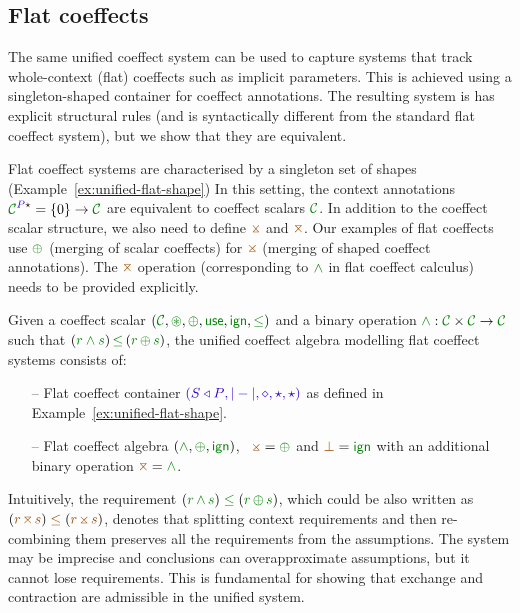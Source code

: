 
\subsection{Flat coeffects}
\label{sec:unified-flat}

The same unified coeffect system can be used to capture systems that track whole-context (flat) 
coeffects such as implicit parameters. This is achieved using a singleton-shaped container for
coeffect annotations. The resulting system is has explicit structural rules (and is syntactically
different from the standard flat coeffect system), but we show that they are equivalent.

Flat coeffect systems are characterised by a singleton set of shapes (Example~\ref{ex:unified-flat-shape})
In this setting, the context annotations $\C^{ \SP \sflat } = \{0\} \rightarrow \C$ are equivalent 
to coeffect scalars $\C$. In addition to the coeffect scalar structure, we also need to define $\apar$ 
and $\azip$. Our examples of flat coeffects use $\cpar$ (merging of scalar coeffects) for $\apar$ 
(merging of shaped coeffect annotations). The $\azip$ operation (corresponding to $\czip$
in flat coeffect calculus) needs to be provided explicitly.

\begin{definition}
\label{def:unified-flat}
Given a coeffect scalar $(\C, \cseq, \cpar, \cunit, \czero, \cleq)$ and a binary operation 
$\cclrd{\wedge} : \C \times \C \rightarrow \C$ such that $(\cclrd{r \wedge s}) \,\cleq\, (\cclrd{r}\,\cpar\,\cclrd{s})$, 
the unified coeffect algebra modelling flat coeffect systems consists of:
%
\begin{itemize}{}
\item[--] Flat coeffect container $\sclrd{(\SHP, {|}-{|}, \diamond, \sflat, \sflat)}$ as defined in 
  Example~\ref{ex:unified-flat-shape}.

\item[--] Flat coeffect algebra $(\czip, \cpar, \czero)$, \ie~$\apar = \cpar$ 
  and $\azero = \czero$ with an additional binary operation $\azip = \czip$. 
\end{itemize}
\end{definition}

\noindent
Intuitively, the requirement $(\cclrd{r}\,\czip\,\cclrd{s}) \;\cleq\; (\cclrd{r}\,\cpar\,\cclrd{s})$,
which could be also written as $(\aclrd{r}\,\azip\,\aclrd{s}) \;\aclrd{\leq}\; (\aclrd{r}\,\apar\,\aclrd{s})$,
denotes that splitting context requirements and then re-combining them preserves all the requirements
from the assumptions. The system may be imprecise and conclusions can overapproximate assumptions, but
it cannot lose requirements. This is fundamental for showing that exchange and contraction are admissible
in the unified system. 

